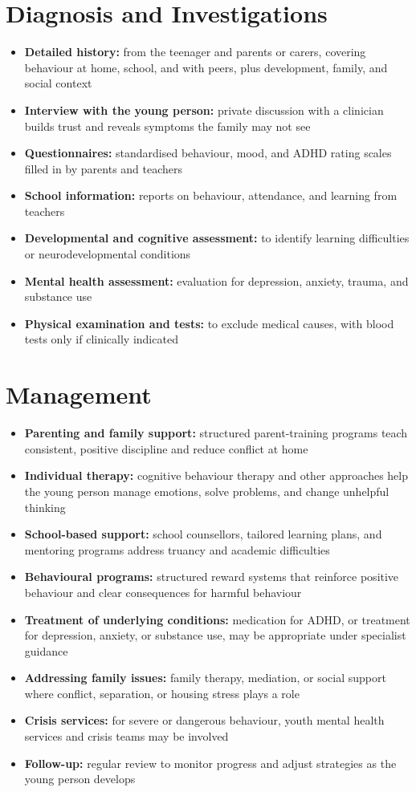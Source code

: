 \section*{Diagnosis and Investigations}
\begin{itemize}
    \item \textbf{Detailed history:} from the teenager and parents or carers, covering behaviour at home, school, and with peers, plus development, family, and social context
    \item \textbf{Interview with the young person:} private discussion with a clinician builds trust and reveals symptoms the family may not see
    \item \textbf{Questionnaires:} standardised behaviour, mood, and ADHD rating scales filled in by parents and teachers
    \item \textbf{School information:} reports on behaviour, attendance, and learning from teachers
    \item \textbf{Developmental and cognitive assessment:} to identify learning difficulties or neurodevelopmental conditions
    \item \textbf{Mental health assessment:} evaluation for depression, anxiety, trauma, and substance use
    \item \textbf{Physical examination and tests:} to exclude medical causes, with blood tests only if clinically indicated
\end{itemize}

\section*{Management}
\begin{itemize}
    \item \textbf{Parenting and family support:} structured parent-training programs teach consistent, positive discipline and reduce conflict at home
    \item \textbf{Individual therapy:} cognitive behaviour therapy and other approaches help the young person manage emotions, solve problems, and change unhelpful thinking
    \item \textbf{School-based support:} school counsellors, tailored learning plans, and mentoring programs address truancy and academic difficulties
    \item \textbf{Behavioural programs:} structured reward systems that reinforce positive behaviour and clear consequences for harmful behaviour
    \item \textbf{Treatment of underlying conditions:} medication for ADHD, or treatment for depression, anxiety, or substance use, may be appropriate under specialist guidance
    \item \textbf{Addressing family issues:} family therapy, mediation, or social support where conflict, separation, or housing stress plays a role
    \item \textbf{Crisis services:} for severe or dangerous behaviour, youth mental health services and crisis teams may be involved
    \item \textbf{Follow-up:} regular review to monitor progress and adjust strategies as the young person develops
\end{itemize}

